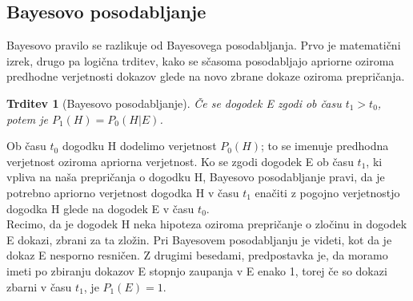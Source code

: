 \documentclass[12pt,a4paper]{amsart}
\theoremstyle{definition} %
\theoremstyle{plain} %
\newtheorem{trditev}[definicija]{Trditev}
\begin{document}
\subsection{Bayesovo posodabljanje}
Bayesovo pravilo se razlikuje od Bayesovega posodabljanja. Prvo je matematični izrek, drugo pa logična trditev, kako se sčasoma posodabljajo
apriorne oziroma predhodne verjetnosti dokazov glede na novo zbrane dokaze oziroma prepričanja.
\begin{trditev}[Bayesovo posodabljanje]
    Če se dogodek E zgodi ob času $t_1 > t_0$, potem je $P_1(H) = P_0(H \lvert E)$.
\end{trditev}
Ob času $t_0$ dogodku H dodelimo verjetnost $P_0(H)$; to se imenuje predhodna verjetnost oziroma apriorna verjetnost. Ko se zgodi dogodek E
ob času $t_1$, ki vpliva na naša prepričanja o dogodku H, Bayesovo posodabljanje pravi, da je potrebno apriorno verjetnost dogodka H v času $t_1$
enačiti z pogojno verjetnostjo dogodka H glede na dogodek E v času $t_0$. \\
Recimo, da je dogodek H neka hipoteza oziroma prepričanje o zločinu in dogodek E dokazi, zbrani za ta zložin. Pri Bayesovem posodabljanju je videti,
kot da je dokaz E nesporno resničen. Z drugimi besedami, predpostavka je, da moramo imeti po zbiranju dokazov E stopnjo zaupanja v E enako 1,
torej če so dokazi zbarni v času $t_1$, je $P_1(E)=1$.

\end{document}
